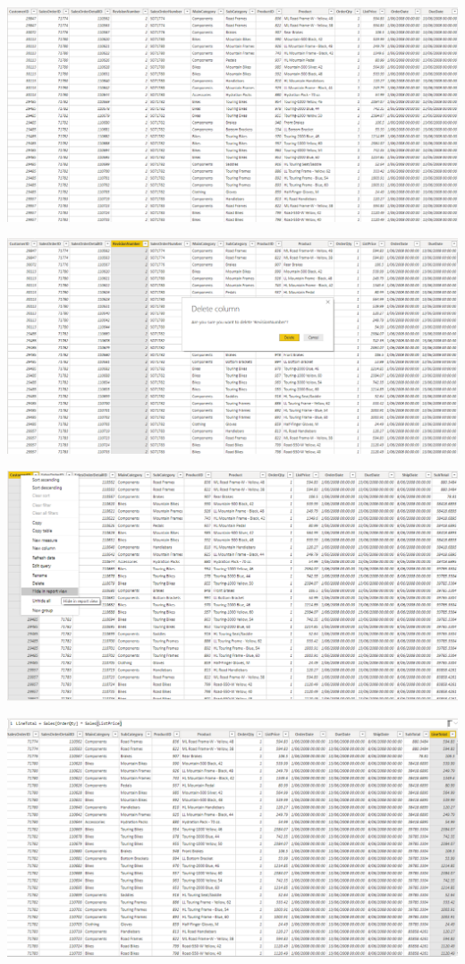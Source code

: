 \documentclass[12pt,letterpaper]{article}
\begin{document}
\begin{center}
\includegraphics[width=16cm]{images/77}\newline
\end{center}
\begin{center}
\includegraphics[width=16cm]{images/88}\newline
\end{center}
\begin{center}
\includegraphics[width=16cm]{images/99}\newline
\end{center}
\begin{center}
\includegraphics[width=16cm]{images/111}\newline
\end{center}
\end{document}
